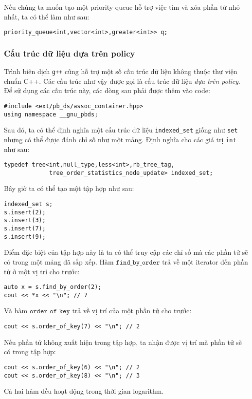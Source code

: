 Nếu chúng ta muốn tạo một priority queue
hỗ trợ việc tìm và xóa
phần tử nhỏ nhất,
ta có thể làm như sau:

\begin{lstlisting}
priority_queue<int,vector<int>,greater<int>> q;
\end{lstlisting}

\subsubsection{Cấu trúc dữ liệu dựa trên policy}

Trình biên dịch \texttt{g++} cũng hỗ trợ
một số cấu trúc dữ liệu không thuộc
thư viện chuẩn C++.
Các cấu trúc như vậy được gọi là
cấu trúc dữ liệu \emph{dựa trên policy}.
Để sử dụng các cấu trúc này, các dòng sau
phải được thêm vào code:
\begin{lstlisting}
#include <ext/pb_ds/assoc_container.hpp>
using namespace __gnu_pbds; 
\end{lstlisting}
Sau đó, ta có thể định nghĩa một cấu trúc dữ liệu \texttt{indexed\_set}
giống như \texttt{set} nhưng có thể được đánh chỉ số như một mảng.
Định nghĩa cho các giá trị \texttt{int} như sau:
\begin{lstlisting}
typedef tree<int,null_type,less<int>,rb_tree_tag,
             tree_order_statistics_node_update> indexed_set; 
\end{lstlisting}
Bây giờ ta có thể tạo một tập hợp như sau:
\begin{lstlisting}
indexed_set s;
s.insert(2);
s.insert(3);
s.insert(7);
s.insert(9);
\end{lstlisting}
Điểm đặc biệt của tập hợp này là ta có thể truy cập
các chỉ số mà các phần tử sẽ có trong một mảng đã sắp xếp.
Hàm $\texttt{find\_by\_order}$ trả về
một iterator đến phần tử ở một vị trí cho trước:
\begin{lstlisting}
auto x = s.find_by_order(2);
cout << *x << "\n"; // 7
\end{lstlisting}
Và hàm $\texttt{order\_of\_key}$
trả về vị trí của một phần tử cho trước:
\begin{lstlisting}
cout << s.order_of_key(7) << "\n"; // 2
\end{lstlisting}
Nếu phần tử không xuất hiện trong tập hợp,
ta nhận được vị trí mà phần tử sẽ có
trong tập hợp:
\begin{lstlisting}
cout << s.order_of_key(6) << "\n"; // 2
cout << s.order_of_key(8) << "\n"; // 3
\end{lstlisting}
Cả hai hàm đều hoạt động trong thời gian logarithm.

